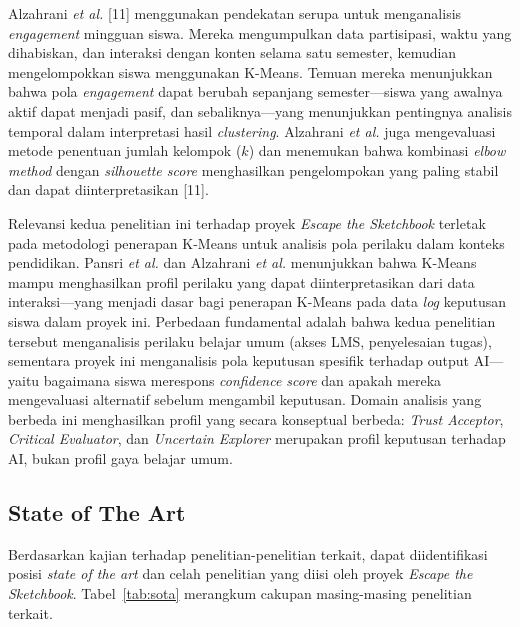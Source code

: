 Alzahrani \textit{et al.} [11] menggunakan pendekatan serupa untuk menganalisis \textit{engagement} mingguan siswa. Mereka mengumpulkan data partisipasi, waktu yang dihabiskan, dan interaksi dengan konten selama satu semester, kemudian mengelompokkan siswa menggunakan K-Means. Temuan mereka menunjukkan bahwa pola \textit{engagement} dapat berubah sepanjang semester—siswa yang awalnya aktif dapat menjadi pasif, dan sebaliknya—yang menunjukkan pentingnya analisis temporal dalam interpretasi hasil \textit{clustering}. Alzahrani \textit{et al.} juga mengevaluasi metode penentuan jumlah kelompok ($k$) dan menemukan bahwa kombinasi \textit{elbow method} dengan \textit{silhouette score} menghasilkan pengelompokan yang paling stabil dan dapat diinterpretasikan [11].

Relevansi kedua penelitian ini terhadap proyek \textit{Escape the Sketchbook} terletak pada metodologi penerapan K-Means untuk analisis pola perilaku dalam konteks pendidikan. Pansri \textit{et al.} dan Alzahrani \textit{et al.} menunjukkan bahwa K-Means mampu menghasilkan profil perilaku yang dapat diinterpretasikan dari data interaksi—yang menjadi dasar bagi penerapan K-Means pada data \textit{log} keputusan siswa dalam proyek ini. Perbedaan fundamental adalah bahwa kedua penelitian tersebut menganalisis perilaku belajar umum (akses LMS, penyelesaian tugas), sementara proyek ini menganalisis pola keputusan spesifik terhadap output AI—yaitu bagaimana siswa merespons \textit{confidence score} dan apakah mereka mengevaluasi alternatif sebelum mengambil keputusan. Domain analisis yang berbeda ini menghasilkan profil yang secara konseptual berbeda: \textit{Trust Acceptor}, \textit{Critical Evaluator}, dan \textit{Uncertain Explorer} merupakan profil keputusan terhadap AI, bukan profil gaya belajar umum.

\subsection{State of The Art}
\label{subsec:state-of-the-art}

Berdasarkan kajian terhadap penelitian-penelitian terkait, dapat diidentifikasi posisi \textit{state of the art} dan celah penelitian yang diisi oleh proyek \textit{Escape the Sketchbook}. Tabel~\ref{tab:sota} merangkum cakupan masing-masing penelitian terkait.


